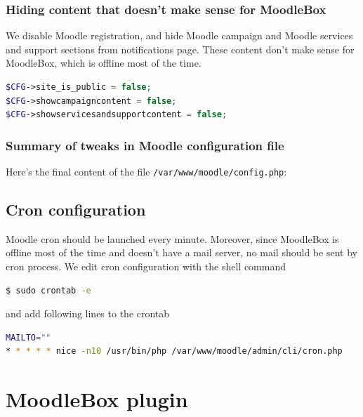 \documentclass[12pt]{article}
\begin{document}
\subsubsection{Hiding content that doesn't make sense for MoodleBox}

We disable Moodle registration, and hide Moodle campaign and Moodle services and support sections from notifications page.
These content don't make sense for MoodleBox, which is offline most of the time.
\begin{lstlisting}[language=php]
$CFG->site_is_public = false;
$CFG->showcampaigncontent = false;
$CFG->showservicesandsupportcontent = false;
\end{lstlisting}

\subsubsection{Summary of tweaks in Moodle configuration file}

Here's the final content of the file \lstinline{/var/www/moodle/config.php}:


\subsection{Cron configuration}

Moodle cron should be launched every minute.
Moreover, since MoodleBox is offline most of the time and doesn't have a mail server, no mail should be sent by cron process.
We edit cron configuration with the shell command
\begin{lstlisting}[language=bash]
$ sudo crontab -e
\end{lstlisting}
and add following lines to the crontab
\begin{lstlisting}[language=bash]
MAILTO=""
* * * * * nice -n10 /usr/bin/php /var/www/moodle/admin/cli/cron.php
\end{lstlisting}

\section{MoodleBox plugin}
\end{document}
